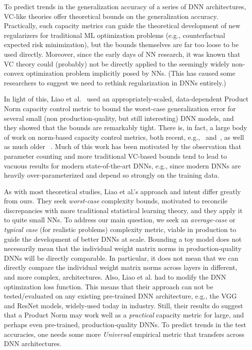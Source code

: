 To predict trends in the generalization accuracy of a series of DNN architectures, VC-like theories offer theoretical bounds on the generalization accuracy. 
Practically, such capacity metrics can guide the
theoretical development of new regularizers for traditional ML optimization problems (e.g., counterfactual expected risk minimization), but the bounds themselves are far too loose to be used directly. 
Moreover, since the early days of NN research, 
it was known that 
VC theory could (probably) not be directly applied to the seemingly widely non-convex optimization problem implicitly posed by NNs. 
(This has caused some researchers to suggest we need to rethink regularization in DNNs entirely.)

In light of this, 
Liao et al.~\cite{LMBx18_TR} used an appropriately-scaled, data-dependent Product Norm capacity control metric to bound the worst-case generalization error for several small (non production-quality, but still interesting) DNN models, and they showed that the bounds are remarkably tight.
%
There is, in fact, a large body of work on norm-based capacity control metrics, both recent, e.g.,~\cite{LMBx18_TR, SHNx17_TR,PLMx18_TR} and~\cite{NTS14_TR,NTS15,NBMS17_TR,BFT17_TR,YM17_TR,KKB17_TR,NBS17_TR,AGNZ18_TR,ACH18_TR,ZF18_TR}, as well as much older ~\cite{Bar97,MN09_TR}. 
Much of this work has been motivated by the observation that parameter counting and more traditional VC-based bounds tend to lead to 
vacuous results for modern state-of-the-art DNNs, e.g., since modern DNNs are heavily over-parameterized and depend so strongly on the training data.

As with most theoretical studies, Liao et al.'s approach and intent differ greatly from ours.
They seek \emph{worst-case} complexity bounds, motivated to reconcile discrepancies with more traditional statistical learning theory, and they apply it to quite small NNs.
To address our main question, we seek an \emph{average-case} or \emph{typical case} (for realistic problems) complexity metric, viable in production to guide the development of better DNNs at scale.
Bounding a toy model does not necessarily mean that the individual weight matrix norms in production-quality DNNs will be directly comparable.
In particular, it does not mean that we can directly compare the individual weight matrix norms across layers in different, and more complex, architectures. 
Also, 
Liao et al. had to modify the DNN optimization loss function.
This means that their approach can not be tested/evaluated on any existing pre-trained DNN architecture, e.g., the VGG and ResNet models, widely-used today in industry. 
Still, their results do suggest that a Product Norm may work well as a \emph{practical} capacity metric for large, and perhaps even pre-trained, production-quality DNNs.   
To predict trends in the test accuracies, one needs some more \emph{Universal} empirical metric that transfers across DNN architectures.

